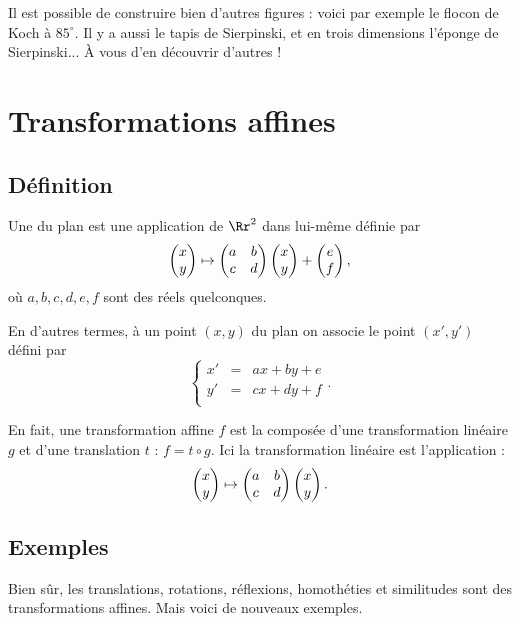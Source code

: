 \documentclass[11pt,class=report,crop=false]{standalone}
\begin{document}
Il est possible de construire bien d'autres figures : voici par exemple le flocon de Koch à $85^\circ$. Il y a aussi le tapis de Sierpinski, et en trois dimensions l'éponge de Sierpinski... \`A vous d'en découvrir d'autres !




\section{Transformations affines}

\subsection{Définition}

Une  du plan est une application
de $\Rr^2$ dans lui-même définie 
par
$$\begin{pmatrix}x \\ y\end{pmatrix} \mapsto \begin{pmatrix}a & b \\ c & d \\  \end{pmatrix}
\begin{pmatrix}x \\ y\end{pmatrix} + \begin{pmatrix}e \\ f\end{pmatrix},$$
où $a,b,c,d, e, f$ sont des réels quelconques.

En d'autres termes, à un point $(x,y)$ du plan
on associe le point $(x',y')$ défini par 
$$\left \{
\begin{array}{rcl}
    x' &=& ax + by + e \\
    y' &=& cx + dy + f \\
\end{array}
\right..$$

En fait, une transformation affine $f$ est la composée d'une transformation
linéaire $g$ et d'une translation $t$ : $f = t \circ g$.
Ici la transformation linéaire est l'application :
$$\begin{pmatrix}x \\ y\end{pmatrix} \mapsto \begin{pmatrix}a & b \\ c & d \\  \end{pmatrix}
\begin{pmatrix}x \\ y\end{pmatrix}.$$


\subsection{Exemples}

Bien sûr, les translations, rotations, réflexions, homothéties et similitudes sont
des transformations affines. Mais voici de nouveaux exemples.
\end{document}
